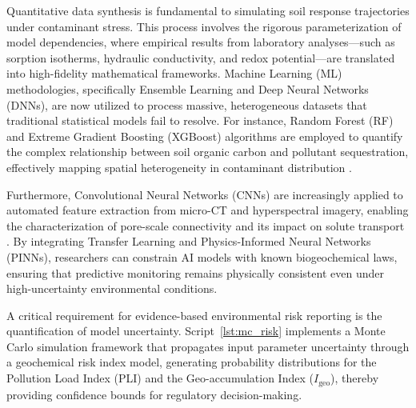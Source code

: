 \documentclass[environments,article,submit,pdftex,moreauthors]{Definitions/mdpi}
\begin{document}
Quantitative data synthesis is fundamental to simulating soil response
trajectories under contaminant stress. This process involves the rigorous
parameterization of model dependencies, where empirical results from laboratory
analyses---such as sorption isotherms, hydraulic conductivity, and redox
potential---are translated into high-fidelity mathematical frameworks. Machine
Learning (ML) methodologies, specifically Ensemble Learning and Deep Neural
Networks (DNNs), are now utilized to process massive, heterogeneous datasets
that traditional statistical models fail to resolve. For instance, Random
Forest (RF) and Extreme Gradient Boosting (XGBoost) algorithms are employed
to quantify the complex relationship between soil organic carbon and pollutant
sequestration, effectively mapping spatial heterogeneity in contaminant
distribution \cite{Wadoux2024,Sahab2025}.

Furthermore, Convolutional Neural Networks (CNNs) are increasingly applied to
automated feature extraction from micro-CT and hyperspectral imagery, enabling
the characterization of pore-scale connectivity and its impact on solute
transport \cite{Yaqoob}. By integrating Transfer Learning and
Physics-Informed Neural Networks (PINNs), researchers can constrain AI models
with known biogeochemical laws, ensuring that predictive monitoring remains
physically consistent even under high-uncertainty environmental conditions.

A critical requirement for evidence-based environmental risk reporting is the
quantification of model uncertainty. Script~\ref{lst:mc_risk} implements a
Monte Carlo simulation framework that propagates input parameter uncertainty
through a geochemical risk index model, generating probability distributions
for the Pollution Load Index (PLI) and the Geo-accumulation Index
($I_\mathrm{geo}$), thereby providing confidence bounds for regulatory
decision-making.
\end{document}
